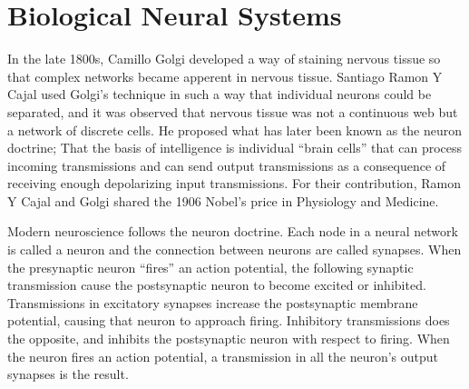
% 







\section{Biological Neural Systems}
	
	In the late 1800s, Camillo Golgi developed a way of staining nervous tissue so that complex networks became apperent in nervous tissue.
	Santiago Ramon Y Cajal used Golgi's technique in such a way that individual neurons could be separated, and it was observed that nervous tissue was not a continuous web but a network of discrete cells. 
	He proposed what has later been known as the neuron doctrine; That the basis of intelligence is individual ``brain cells'' that can process incoming transmissions and 
		can send output transmissions as a consequence of receiving enough depolarizing input transmissions.
	For their contribution, Ramon Y Cajal and Golgi shared the 1906 Nobel's price in Physiology and Medicine.
	\cite{NeuroscienceExploringTheBrain3edKAP2}

	Modern neuroscience follows the neuron doctrine. 
	Each node in a neural network is called a neuron and the connection between neurons are called synapses.
	When the presynaptic neuron ``fires'' an action potential, the following synaptic transmission cause the postsynaptic neuron to become excited or inhibited.
	Transmissions in excitatory synapses increase the postsynaptic membrane potential, causing that neuron to approach firing. %
	Inhibitory transmissions does the opposite, and inhibits the postsynaptic neuron with respect to firing.
	When the neuron fires an action potential, a transmission in all the neuron's output synapses is the result.
	\cite{PrinciplesOfNeuralScience4edKAP02}


